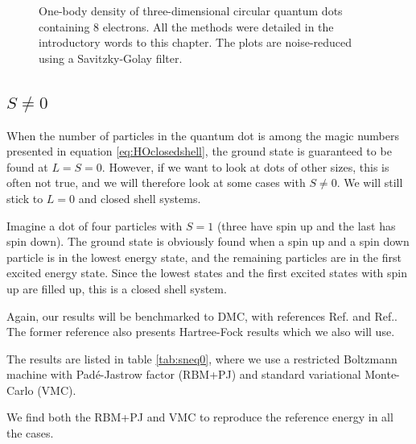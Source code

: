 \begin{figure}[H]
	\centering
	
	\caption{One-body density of three-dimensional circular quantum dots containing 8 electrons. All the methods were detailed in the introductory words to this chapter. The plots are noise-reduced using a Savitzky-Golay filter.}
	\label{fig:lowfreqOB3D}
\end{figure}

\iffalse
\subsection{$S\neq0$}
When the number of particles in the quantum dot is among the magic numbers presented in equation \eqref{eq:HOclosedshell}, the ground state is guaranteed to be found at $L=S=0$. However, if we want to look at dots of other sizes, this is often not true, and we will therefore look at some cases with $S\neq 0$. We will still stick to $L=0$ and closed shell systems.

Imagine a dot of four particles with $S=1$ (three have spin up and the last has spin down). The ground state is obviously found when a spin up and a spin down particle is in the lowest energy state, and the remaining particles are in the first excited energy state. Since the lowest states and the first excited states with spin up are filled up, this is a closed shell system.

Again, our results will be benchmarked to DMC, with references Ref.\cite{pederiva_diffusion_2000} and Ref.\cite{ghosal_incipient_2007}. The former reference also presents Hartree-Fock results which we also will use. 

The results are listed in table \eqref{tab:sneq0}, where we use a restricted Boltzmann machine with Padé-Jastrow factor (RBM+PJ) and standard variational Monte-Carlo (VMC). 

We find both the RBM+PJ and VMC to reproduce the reference energy in all the cases. 

